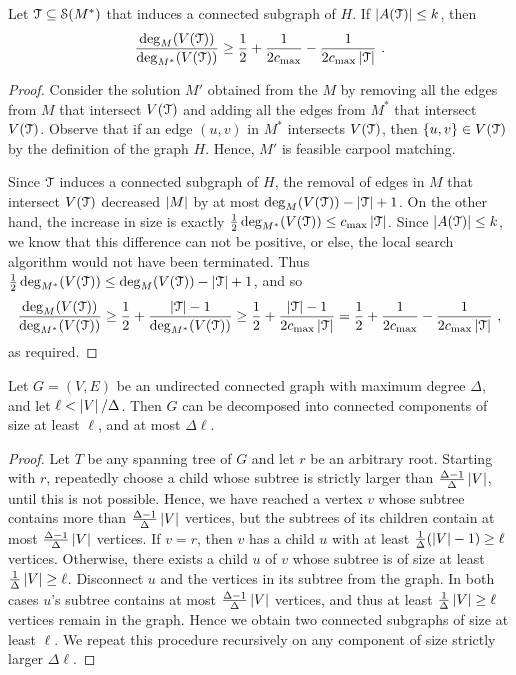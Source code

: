 \begin{lemma}
\label{lemma:r}
Let $\mathcal{T} \subseteq \mathcal{S}(M^*)$ that induces a connected subgraph of
$H$.  If $\left| A(\mathcal{T}) \right| \leq k$, then
\[
\frac{\deg_M(V(\mathcal{T}))}{\deg_{M^*}(V(\mathcal{T}))} 
\geq \frac{1}{2} + \frac{1}{2c_{\max}} - \frac{1}{2c_{\max}\left| \mathcal{T} \right|}
~.
\]
\end{lemma}
\begin{proof}
Consider the solution $M'$ obtained from the $M$ by removing all the
edges from $M$ that intersect $V(\mathcal{T})$ and adding all the edges from
$M^*$ that intersect $V(\mathcal{T})$.  Observe that if an edge $(u,v)$ in
$M^*$ intersects $V(\mathcal{T})$, then $\left\{ u,v \right\} \in V(\mathcal{T})$ by the
definition of the graph $H$.  Hence, $M'$ is feasible carpool
matching.

Since $\mathcal{T}$ induces a connected subgraph of $H$, the removal of
edges in $M$ that intersect $V(\mathcal{T})$ decreased $\left| M \right|$ by at most
$\deg_M(V(\mathcal{T})) - \left| \mathcal{T} \right| + 1$.
%
On the other hand, the increase in size is exactly
 $\frac{1}{2} \deg_{M^*}(V(\mathcal{T})) \leq c_{\max} \left| \mathcal{T} \right|$.
%
Since $\left| A(\mathcal{T}) \right| \leq k$, we know that this difference can not be
positive, or else, the local search algorithm would not have been
terminated.  Thus 
\(
\frac{1}{2} \deg_{M^*}(V(\mathcal{T})) \leq \deg_M(V(\mathcal{T})) - \left| \mathcal{T} \right| + 1
\),
and so
\[
\frac{\deg_M(V(\mathcal{T}))}{\deg_{M^*}(V(\mathcal{T}))}
\geq \frac{1}{2} + \frac{\left| \mathcal{T} \right| - 1}{\deg_{M^*}(V(\mathcal{T}))}
\geq \frac{1}{2} + \frac{\left| \mathcal{T} \right| - 1}{2c_{\max} \left| \mathcal{T} \right|}
=    \frac{1}{2} + \frac{1}{2c_{\max}} - \frac{1}{2c_{\max} \left| \mathcal{T} \right|}
~,
\]
as required.
\end{proof}

\begin{lemma}
\label{lemma:dec}
Let $G = (V,E)$ be an undirected connected graph with maximum degree
$\Delta$, and let $\ell < \left| V \right|/\Delta$.  Then $G$ can be decomposed
into connected components of size at least $\ell$, and at most
$\Delta \ell$.
\end{lemma}
\begin{proof}
Let $T$ be any spanning tree of $G$ and let $r$ be an arbitrary root.
Starting with $r$, repeatedly choose a child whose subtree is strictly
larger than $\frac{\Delta-1}{\Delta} \left| V \right|$, until this is not
possible.  Hence, we have reached a vertex $v$ whose subtree contains
more than $\frac{\Delta-1}{\Delta} \left| V \right|$ vertices, but the subtrees
of its children contain at most $\frac{\Delta-1}{\Delta} \left| V \right|$
vertices.
%
If $v = r$, then $v$ has a child $u$ with at least $\frac{1}{\Delta}
(\left| V \right|-1) \geq \ell$ vertices.  Otherwise, there exists a child $u$
of $v$ whose subtree is of size at least
$\frac{1}{\Delta} \left| V \right| \geq \ell$.  Disconnect $u$ and the vertices in
its subtree from the graph.
%
In both cases $u$'s subtree contains at most
$\frac{\Delta-1}{\Delta} \left| V \right|$ vertices, and thus at least
$\frac{1}{\Delta} \left| V \right| \geq \ell$ vertices remain in the graph.  Hence
we obtain two connected subgraphs of size at least $\ell$.
%
We repeat this procedure recursively on any component of size
strictly larger $\Delta\ell$.
\end{proof}

